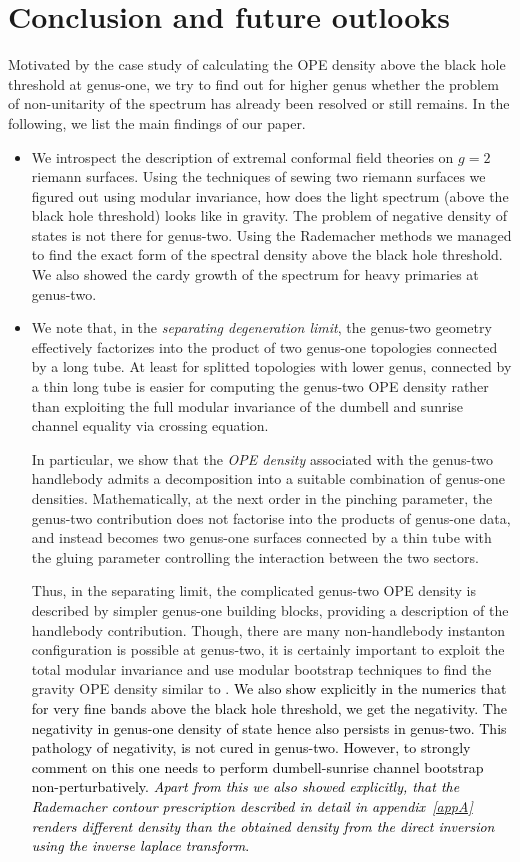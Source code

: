 \documentclass[12 pt]{article}
\begin{document}
\section{Conclusion and future outlooks}\label{sec5}
Motivated by the case study of calculating the OPE density above the black hole threshold at genus-one, we try to find out for higher genus whether the problem of non-unitarity of the spectrum has already been resolved or still remains.  In the following, we list the main findings of our paper.
\begin{itemize}
    \item We introspect the description of extremal conformal field theories on $g=2$ riemann surfaces. Using the techniques of sewing two riemann surfaces we figured out using modular invariance, how does the light spectrum (above the black hole threshold) looks like in gravity. The problem of negative density of states is not there for genus-two. Using the Rademacher methods we managed to find the exact form of the spectral density above the black hole threshold. We also showed the cardy growth of the spectrum for heavy primaries at genus-two.
\item 
We note that, in the \emph{separating degeneration limit}, the genus-two geometry effectively factorizes into the product of two genus-one topologies connected by a long tube. At least for splitted topologies with lower genus, connected by a thin long tube is easier for computing the genus-two OPE density rather than exploiting the full modular invariance of the dumbell and sunrise channel equality via crossing equation.

In particular, we show that the \emph{OPE density} associated with the genus-two handlebody admits a decomposition into a suitable combination of genus-one densities. Mathematically, at the next order in the pinching parameter, the genus-two contribution does not factorise into the products of genus-one data, and instead becomes two genus-one surfaces connected by a thin tube with the gluing parameter controlling the interaction between the two sectors.

Thus, in the separating limit, the complicated genus-two OPE density is described by simpler genus-one building blocks, providing a description of the handlebody contribution. Though, there are many non-handlebody instanton configuration is possible at genus-two, it is certainly important to exploit the total modular invariance and use modular bootstrap techniques to find the gravity OPE density similar to \cite{Simmons-Duffin:2025qox}. \textcolor{black}{We also show explicitly in the numerics that for very fine bands above the black hole threshold, we get the negativity. The negativity in genus-one density of state hence also persists in genus-two. This pathology of negativity, is not cured in genus-two. However, to strongly comment on this one needs to perform dumbell-sunrise channel bootstrap non-perturbatively. \textit{Apart from this we also showed explicitly, that the Rademacher contour prescription described in detail in appendix~\eqref{appA} renders different density than the obtained density from the direct inversion using the inverse laplace transform}. }


\end{itemize}
\end{document}
